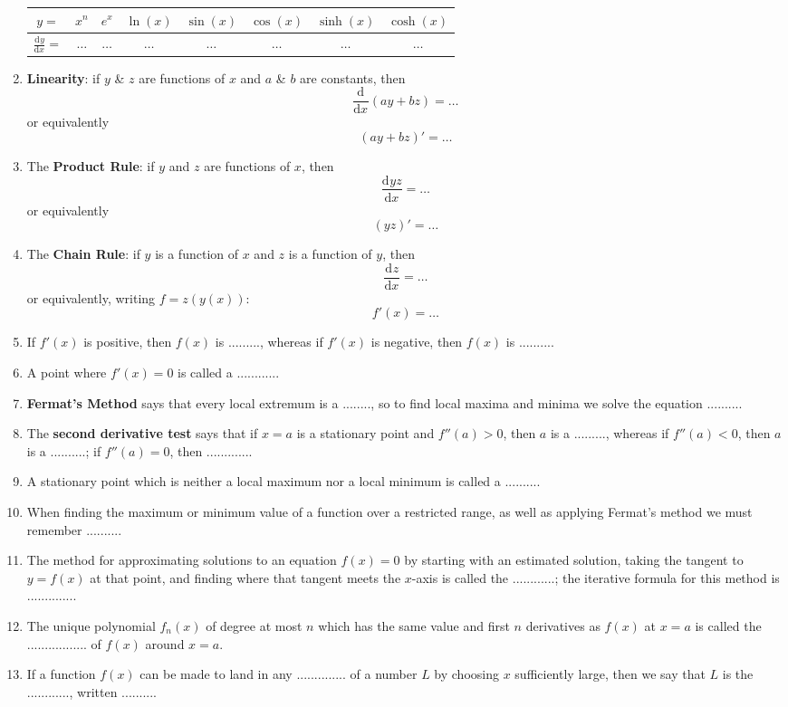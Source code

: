 \documentclass{article}
\newcommand{\deriv}[3][]{\frac{\mathrm{d}^{#1} #2}{\mathrm{d}#3^{#1}}}
\begin{document}
\begin{enumerate}
		\hfill\begin{tabular}{c|c|c|c|c|c|c|c}
			$y=$ & $x^n$ & $e^x$ & $\ln(x)$ & $\sin(x)$ & $\cos(x)$ & $\sinh(x)$ & $\cosh(x)$\\ \hline
			$\deriv{y}{x}=$ & $\hdots$ & $\hdots$ & $\hdots$ & $\hdots$ & $\hdots$ & $\hdots$ & $\hdots$
		\end{tabular}\hfill
	\item \textbf{Linearity}: if $y$ \& $z$ are functions of $x$ and $a$ \& $b$ are constants, then
		\[\deriv{}{x}\left(ay+bz\right) = \hdots\]
		or equivalently
		\[(ay+bz)'=\hdots\]
	\item The \textbf{Product Rule}: if $y$ and $z$ are functions of $x$, then
		\[\deriv{yz}{x} = \hdots\]
		or equivalently
		\[(yz)'=\hdots\]
	\item The \textbf{Chain Rule}: if $y$ is a function of $x$ and $z$ is a function of $y$, then
		\[\deriv{z}{x}=\hdots\]
		or equivalently, writing $f=z(y(x))$:
		\[f'(x)=\hdots\]
	\item If $f'(x)$ is positive, then $f(x)$ is ........., whereas if $f'(x)$ is negative, then $f(x)$ is ..........
	\item A point where $f'(x)=0$ is called a ............
	\item \textbf{Fermat's Method} says that every local extremum is a ........, so to find local maxima and minima we solve the equation ..........
	\item The \textbf{second derivative test} says that if $x=a$ is a stationary point and $f''(a)>0$, then $a$ is a ........., whereas if $f''(a)<0$, then $a$ is a ..........; if $f''(a)=0$, then .............
	\item A stationary point which is neither a local maximum nor a local minimum is called a ..........
	\item When finding the maximum or minimum value of a function over a restricted range, as well as applying Fermat's method we must remember ..........
	\item The method for approximating solutions to an equation $f(x)=0$ by starting with an estimated solution, taking the tangent to $y=f(x)$ at that point, and finding where that tangent meets the $x$-axis is called the ............; the iterative formula for this method is ..............
	\item The unique polynomial $f_n(x)$ of degree at most $n$ which has the same value and first $n$ derivatives as $f(x)$ at $x=a$ is called the ................. of $f(x)$ around $x=a$.
	\item If a function $f(x)$ can be made to land in any .............. of a number $L$ by choosing $x$ sufficiently large, then we say that $L$ is the ............, written ..........

\end{enumerate}
\end{document}
